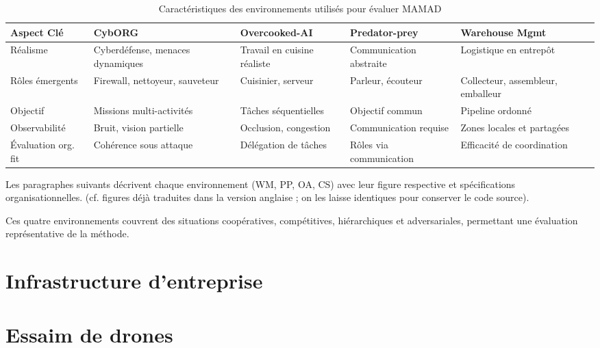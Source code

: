 \begin{table}[h!]
    \centering
    \begin{footnotesize}
        \renewcommand{\arraystretch}{1.3}
        \begin{tabular}{p{2cm}p{2.2cm}p{2.2cm}p{2.2cm}p{2.2cm}}
            \hline
            \textbf{Aspect Clé} & \textbf{CybORG}                & \textbf{Overcooked-AI} & \textbf{Predator-prey} & \textbf{Warehouse Mgmt} \\ \hline
            Réalisme            & Cyberdéfense, menaces dynamiques & Travail en cuisine réaliste & Communication abstraite & Logistique en entrepôt \\ \hline
            Rôles émergents     & Firewall, nettoyeur, sauveteur & Cuisinier, serveur      & Parleur, écouteur       & Collecteur, assembleur, emballeur \\ \hline
            Objectif            & Missions multi-activités        & Tâches séquentielles    & Objectif commun         & Pipeline ordonné \\ \hline
            Observabilité       & Bruit, vision partielle         & Occlusion, congestion   & Communication requise   & Zones locales et partagées \\ \hline
            Évaluation org. fit & Cohérence sous attaque          & Délégation de tâches    & Rôles via communication & Efficacité de coordination \\ \hline
        \end{tabular}
        \caption{Caractéristiques des environnements utilisés pour évaluer MAMAD}
        \label{tab:mamad_env_characteristics}
    \end{footnotesize}
\end{table}

Les paragraphes suivants décrivent chaque environnement (WM, PP, OA, CS) avec leur figure respective et spécifications organisationnelles. (cf. figures déjà traduites dans la version anglaise ; on les laisse identiques pour conserver le code source).

\bigskip

\noindent Ces quatre environnements couvrent des situations coopératives, compétitives, hiérarchiques et adversariales, permettant une évaluation représentative de la méthode.


\section{Infrastructure d'entreprise}
\section{Essaim de drones}
